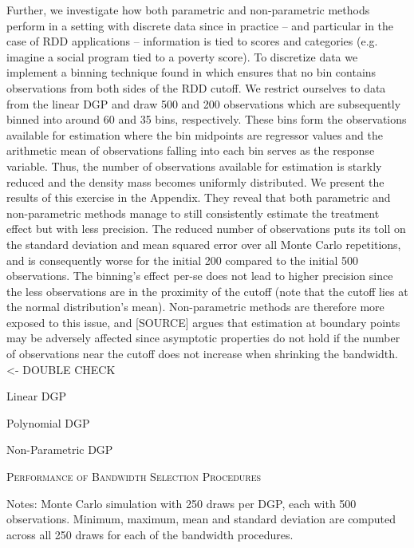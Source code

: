 \documentclass[11pt, a4paper, leqno]{article}
\numberwithin{equation}{section}
\numberwithin{figure}{section}
\numberwithin{table}{section}
\numberwithin{algorithm}{section}
\begin{document}
Further, we investigate how both parametric and non-parametric methods perform in a setting with discrete data since in practice -- and particular in the case of RDD applications -- information is tied to scores and categories (e.g. imagine a social program tied to a poverty score). To discretize data we implement a binning technique found in \cite{mccrary_2008} which ensures that no bin contains observations from both sides of the RDD cutoff. We restrict ourselves to data from the linear DGP and draw 500 and 200 observations which are subsequently binned into around 60 and 35 bins, respectively. These bins form the observations available for estimation where the bin midpoints are regressor values and the arithmetic mean of observations falling into each bin serves as the response variable. Thus, the number of observations available for estimation is starkly reduced and the density mass becomes uniformly distributed. We present the results of this exercise in the Appendix. They reveal that both parametric and non-parametric methods manage to still consistently estimate the treatment effect but with less precision. The reduced number of observations puts its toll on the standard deviation and mean squared error over all Monte Carlo repetitions, and is consequently worse for the initial 200 compared to the initial 500 observations. The binning's effect per-se does not lead to higher precision since the less observations are in the proximity of the cutoff (note that the cutoff lies at the normal distribution's mean). Non-parametric methods are therefore more exposed to this issue, and [SOURCE] argues that estimation at boundary points may be adversely affected since asymptotic properties do not hold if the number of observations near the cutoff does not increase when shrinking the bandwidth. <- DOUBLE CHECK

\begin{table}[H]
	\begin{subtable}{\textwidth}
		\centering
		
		\caption{Linear DGP}
		\label{tab: bw_perf_linear}
		\hspace{\fill}
	\end{subtable}
	\begin{subtable}{\textwidth}
		\centering
		
		\caption{Polynomial DGP}
		\label{tab: bw_perf_poly}
		\hspace{\fill}
	\end{subtable}
	\begin{subtable}{\textwidth}
		\centering
		
		\caption{Non-Parametric DGP}
		\label{tab: bw_perf_nonparam}
	\end{subtable}
	\caption{\textsc{Performance of Bandwidth Selection Procedures}}
	\label{tab: bw_perf}
	\medskip
	\justify
	\footnotesize{Notes: Monte Carlo simulation with 250 draws per DGP, each with 500 observations. Minimum, maximum, mean and standard deviation are computed across all 250 draws for each of the bandwidth procedures.}
\end{table}
\end{document}
